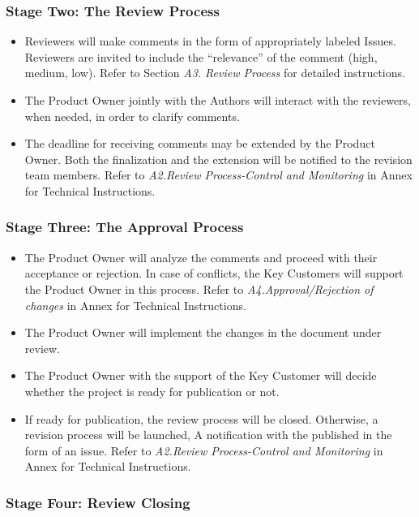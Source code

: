\documentclass{template/openetcs_article}
\begin{document}
\subsubsection{Stage Two: The Review Process}

\begin{itemize}
\item Reviewers will make comments in the form of appropriately labeled Issues. Reviewers are invited to include the “relevance” of the comment (high, medium, low). Refer to Section {\it A3. Review Process} for detailed instructions.
\item The Product Owner jointly with the Authors will interact with the reviewers, when needed, in order to clarify comments.  
\item The deadline for receiving comments may be extended by the Product Owner. Both the finalization and the extension will be notified to the revision team members. Refer to {\it A2.Review Process-Control and Monitoring} in Annex for Technical Instructions.
\end{itemize}

\subsubsection{Stage Three: The Approval Process}

\begin{itemize}
\item The Product Owner will analyze the comments and proceed with their acceptance or rejection. In case of conflicts, the Key Customers will support the Product Owner in this process. Refer to {\it A4.Approval/Rejection of changes} in Annex for Technical Instructions.
\item The Product Owner will implement the changes in the document under review.  
\item The Product Owner with the support of the Key Customer will decide whether the project is ready for publication or not.
\item If ready for publication, the review process will be closed. Otherwise, a revision process will be launched, A notification with the published in the form of an issue. Refer to {\it A2.Review Process-Control and Monitoring} in Annex for Technical Instructions.
\end{itemize}

\subsubsection{Stage Four: Review Closing}
\end{document}
